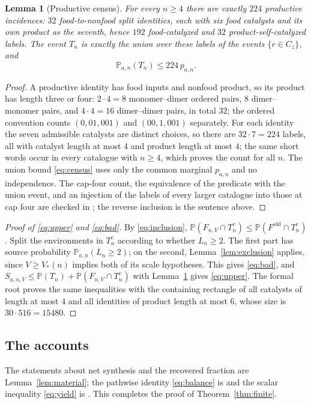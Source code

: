 \documentclass[11pt,letterpaper]{article}
\theoremstyle{plain}
\newtheorem{lemma}[theorem]{Lemma}
\theoremstyle{definition}
\theoremstyle{remark}
\numberwithin{equation}{section}
\newcommand{\PP}{\mathbb P}
\newcommand{\Fold}{F^{\mathrm{old}}}
\begin{document}
\begin{lemma}[Productive census]\label{lem:census}
For every $n\ge4$ there are exactly $224$ productive incidences: $32$ food-to-nonfood split identities, each with six food catalysts and its own product as the seventh, hence $192$ food-catalyzed and $32$ product-self-catalyzed labels. The event $T_n$ is exactly the union over these labels of the events $\{r\in C_z\}$, and
\begin{equation}\label{eq:census}
 \PP_{a,n}(T_n)\le224\,p_{a,n}.
\end{equation}
\end{lemma}
\begin{proof}
A productive identity has food inputs and nonfood product, so its product has length three or four: $2\cdot4=8$ monomer--dimer ordered pairs, $8$ dimer--monomer pairs, and $4\cdot4=16$ dimer--dimer pairs, in total $32$; the ordered convention counts $(0,01,001)$ and $(00,1,001)$ separately. For each identity the seven admissible catalysts are distinct choices, so there are $32\cdot7=224$ labels, all with catalyst length at most $4$ and product length at most $4$; the same short words occur in every catalogue with $n\ge4$, which proves the count for all $n$. The union bound \eqref{eq:census} uses only the common marginal $p_{a,n}$ and no independence. The cap-four count, the equivalence of the predicate with the union event, and an injection of the labels of every larger catalogue into those at cap four are checked in ; the reverse inclusion is the sentence above.
\end{proof}

\begin{proof}[Proof of \eqref{eq:upper} and \eqref{eq:bad}]
By \eqref{eq:inclusion}, $\PP(F_{n,V}\cap T_n^c)\le\PP(\Fold\cap T_n^c)$. Split the environments in $T_n^c$ according to whether $L_n\ge2$. The first part has source probability $\PP_{a,n}(L_n\ge2)$; on the second, Lemma~\ref{lem:exclusion} applies, since $V\ge V_*(n)$ implies both of its scale hypotheses. This gives \eqref{eq:bad}, and $S_{a,n,V}\le\PP(T_n)+\PP(F_{n,V}\cap T_n^c)$ with Lemma~\ref{lem:census} gives \eqref{eq:upper}. The formal root proves the same inequalities with the containing rectangle of all catalysts of length at most $4$ and all identities of product length at most $6$, whose size is $30\cdot516=15480$.
\end{proof}

\subsection{The accounts}
The statements about net synthesis and the recovered fraction are Lemma~\ref{lem:material}; the pathwise identity \eqref{eq:balance} is  and the scalar inequality \eqref{eq:yield} is . This completes the proof of Theorem~\ref{thm:finite}.
\end{document}
